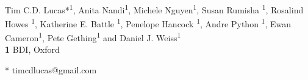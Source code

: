 \documentclass[10pt,letterpaper]{article}
\begin{document}
\vspace*{0.2in}

\begin{flushleft}
{\Large
\textbf{} %
}
\newline
\\
Tim C.D. Lucas*\textsuperscript{1}, Anita Nandi\textsuperscript{1}, Michele Nguyen\textsuperscript{1}, Susan Rumisha \textsuperscript{1}, Rosalind Howes \textsuperscript{1}, Katherine E. Battle \textsuperscript{1}, Penelope Hancock \textsuperscript{1}, Andre Python \textsuperscript{1}, Ewan Cameron\textsuperscript{1}, Pete Gething\textsuperscript{1} and Daniel J. Weiss\textsuperscript{1}
\\
\bigskip
\textbf{1} BDI, Oxford
\\
\bigskip

% 
%




* timcdlucas@gmail.com

\end{flushleft}
\end{document}
